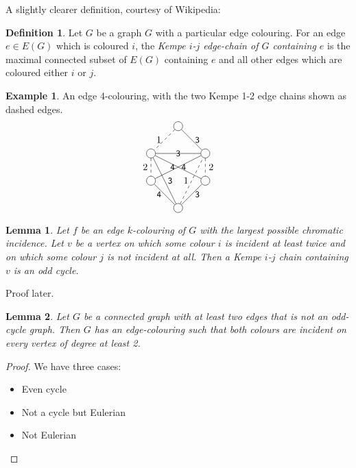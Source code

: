 \documentclass{article}
\newtheorem*{lem}{Lemma}
\theoremstyle{definition}
\newtheorem*{defn}{Definition}
\newtheorem*{ex}{Example}
\begin{document}
A slightly clearer definition, courtesy of Wikipedia:
\begin{defn}
	Let $G$ be a graph $G$ with a particular edge colouring. For an edge $e \in E(G)$ which is coloured $i$, the \emph{Kempe $i$-$j$ edge-chain of $G$ containing $e$} is the maximal connected subset of $E(G)$ containing $e$ and all other edges which are coloured either $i$ or $j$.
\end{defn}
\begin{ex}
	An edge 4-colouring, with the two Kempe 1-2 edge chains shown as dashed edges.
$$
\begin{tikzpicture}[baseline=5.5ex]
  \node[draw,circle] (1) at (1,3) {};
  \node[draw,circle] (2) at (0,2) {};
  \node[draw,circle] (3) at (2,2) {};
  \node[draw,circle] (4) at (0,1) {};
  \node[draw,circle] (5) at (2,1) {};
  \node[draw,circle] (6) at (1,0) {};
  \path[every node/.style={font=\sffamily\small}]
  (1) edge node [right]{3} (3)
    (2) edge node {3} (3)
    (3) edge node [left]{4} (4)
    (4) edge node [left]{4} (6)
    (5) edge node [right]{4} (2)
    (6) edge node [right]{3} (5)
    (2) edge node [right]{3} (6);
  \draw[dashed]
  (1) edge node [left]{1} (2)
  (2) edge node [left]{2} (4)
  (6) edge node [left]{1} (3)
    (3) edge node [right]{2} (5);
\end{tikzpicture}$$
\end{ex}

\begin{lem}
Let $f$ be an edge $k$-colouring of $G$ with the largest possible chromatic incidence.
Let $v$ be a vertex on which some colour $i$ is incident at least twice and on which some colour $j$ is not incident at all.
Then a Kempe $i$-$j$ chain containing $v$ is an odd cycle.
\end{lem}

Proof later.

\begin{lem}
Let $G$ be a connected graph with at least two edges that is not an odd-cycle graph.
Then $G$ has an edge-colouring such that both colours are incident on every vertex of degree at least 2.
\end{lem}

\begin{proof}
We have three cases: \\
\begin{itemize}
\item Even cycle
\item Not a cycle but Eulerian
\item Not Eulerian
\end{itemize}
\end{proof}
\end{document}
